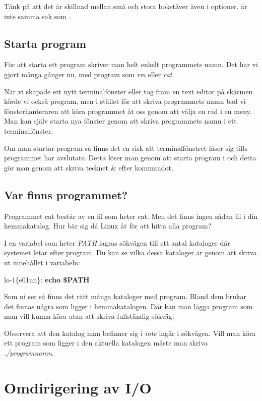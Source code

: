 \documentclass[a4paper,twocolumn]{book}
\begin{document}
Tänk på att det är skillnad mellan små och stora bokstäver även i
optioner.  är inte samma sak som .

\subsection{Starta program}

För att starta ett program skriver man helt enkelt programmets
namn. Det har vi gjort många gånger nu, med program som \emph{rm}
eller \emph{cat}.

När vi skapade ett nytt terminalfönster eller tog fram en text editor på
skärmen körde vi också program, men i stället för att skriva
programmets namn bad vi fönsterhanteraren att köra programmet åt oss
genom att välja en rad i en meny. Man kan själv starta nya fönster
genom att skriva programmets namn i ett terminalfönster.

Om man startar program så finns det en risk att terminalfönstret låser sig
tills programmet har avslutats. Detta löser man genom att starta program i 
 och detta gör man genom att skriva tecknet \& efter 
kommandot.
\subsection{Var finns programmet?}

Programmet cat består av en fil som heter cat. Men det finns ingen
sådan fil i din hemmakatalog. Hur bär sig då Linux åt för att hitta
alla program?

I en variabel som heter \emph{PATH} lagras sökvägen till
ett antal kataloger där systemet letar efter program. Du kan se vilka dessa kataloger är genom att skriva ut innehållet i variabeln:

\begin{example}
lo-1\{e01nn\}: \textbf{echo \$PATH}
\end{example}


Som ni ser så finns det rätt många kataloger med program. Bland dem
brukar det finnas några som ligger i hemmakatalogen. Där kan man lägga program som
man vill kunna köra utan att skriva fullständig sökväg.

Observera att den katalog man befinner sig i \emph{inte} ingår i
sökvägen. Vill man köra ett program  som ligger i den
aktuella katalogen måste man skriva \emph{./programnamn}.

\section{Omdirigering av I/O}
\end{document}
